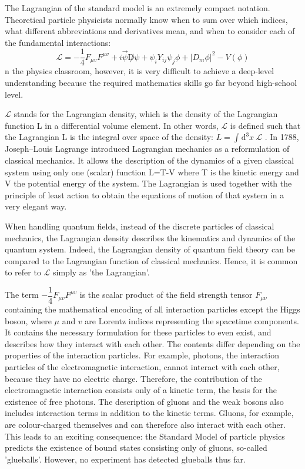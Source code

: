 The Lagrangian of the standard model is an extremely compact notation. Theoretical particle physicists normally know when to sum over which indices, what different abbreviations and derivatives mean, and when to consider each of the fundamental interactions:
\begin{equation}
    \mathcal{L} = - \dfrac{1}{4}F_{\mu v}F^{\mu v} + i\vec{\psi}{\not D} \psi + \psi_i  Y_{ij} \psi_j \phi + |D_m \phi|^2 - V(\phi)
\end{equation}
n the physics classroom, however, it is very difficult to achieve a deep-level understanding because the required mathematics skills go far beyond high-school level.

$\mathcal{L}$  stands for the Lagrangian density, which is the density of the Lagrangian function L in a differential volume element. In other words, $\mathcal{L}$  is defined such that the Lagrangian L is the integral over space of the density: $L={\int}^{}{{\text{d}}^{3}}x~\mathcal{L}$ . 
In 1788, Joseph–Louis Lagrange introduced Lagrangian mechanics as a reformulation of classical mechanics. It allows the description of the dynamics of a given classical system using only one (scalar) function L=T-V where T is the kinetic energy and V the potential energy of the system. The Lagrangian is used together with the principle of least action to obtain the equations of motion of that system in a very elegant way.

When handling quantum fields, instead of the discrete particles of classical mechanics, the Lagrangian density describes the kinematics and dynamics of the quantum system. Indeed, the Lagrangian density of quantum field theory can be compared to the Lagrangian function of classical mechanics. Hence, it is common to refer to $\mathcal{L}$  simply as 'the Lagrangian'.

The term $-\dfrac{1}{4}F_{\mu v}F^{\mu v}$ is the scalar product of the field strength tensor ${{F}_{\mu \nu}}$  containing the mathematical encoding of all interaction particles except the Higgs boson, where $\mu$ and $v$ are Lorentz indices representing the spacetime components. It contains the necessary formulation for these particles to even exist, and describes how they interact with each other. The contents differ depending on the properties of the interaction particles. For example, photons, the interaction particles of the electromagnetic interaction, cannot interact with each other, because they have no electric charge. Therefore, the contribution of the electromagnetic interaction consists only of a kinetic term, the basis for the existence of free photons. The description of gluons and the weak bosons also includes interaction terms in addition to the kinetic terms. Gluons, for example, are colour-charged themselves and can therefore also interact with each other. This leads to an exciting consequence: the Standard Model of particle physics predicts the existence of bound states consisting only of gluons, so-called 'glueballs'. However, no experiment has detected glueballs thus far.


